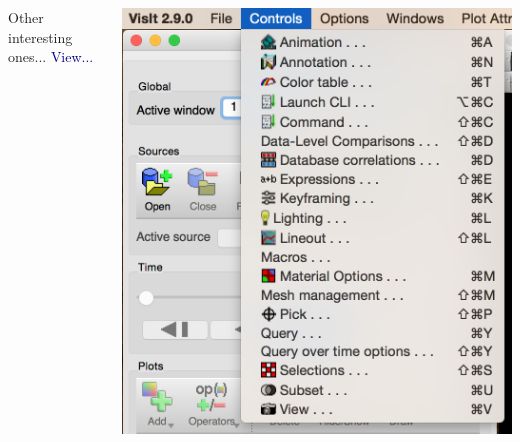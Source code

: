 \begin{frame}
\begin{columns}
\begin{column}{6.5cm}
\begin{beamerboxesrounded}[upper=block head,lower=block body,shadow=true]{ Other interesting ones...}
		\hspace{2mm}
		 \textcolor{DarkBlue}{View...}
	\end{beamerboxesrounded}
\end{column}
\begin{column}{5.25cm}
	\centering
	\includegraphics[width=.85\columnwidth]{figs/visit-guis/visit_ctrls}
\end{column}
\end{columns}
\end{frame}




